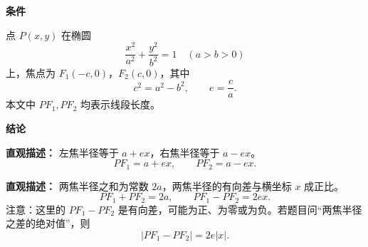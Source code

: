 \begin{statementbox}
	\textbf{\textcolor{CStatement}{条件}}
	\begin{description}[style=nextline, leftmargin=2.8em, labelsep=0.5em, itemsep=0.35em]
		\item[\textbf{\textcolor{CStatement}{条件 1（椭圆标准式）：}}] 点 $P(x,y)$ 在椭圆
		      \[
			      \frac{x^2}{a^2}+\frac{y^2}{b^2}=1\quad (a>b>0)
		      \]
		      上，焦点为 $F_1(-c,0)$，$F_2(c,0)$，其中
		      \[
			      c^2=a^2-b^2,\qquad e=\frac{c}{a}.
		      \]
		      本文中 $PF_1,PF_2$ 均表示线段长度。
	\end{description}

	\textbf{\textcolor{CStatement}{结论}}
	\begin{description}[style=nextline, leftmargin=2.8em, labelsep=0.5em, itemsep=0.45em]
		\item[\textbf{\textcolor{CStatement}{结论一（焦半径公式）：}}]
		      \textbf{\textcolor{CStatement}{直观描述：}} 左焦半径等于 $a+ex$，右焦半径等于 $a-ex$。
		      \[
			      PF_1 = a+ex,\qquad PF_2 = a-ex.
		      \]

		\item[\textbf{\textcolor{CStatement}{推广结论（焦半径和差）：}}]
		      \textbf{\textcolor{CStatement}{直观描述：}} 两焦半径之和为常数 $2a$，两焦半径的有向差与横坐标 $x$ 成正比。
		      \[
			      PF_1+PF_2 = 2a,\qquad PF_1-PF_2 = 2ex.
		      \]
		      注意：这里的 $PF_1-PF_2$ 是有向差，可能为正、为零或为负。若题目问“两焦半径之差的绝对值”，则
		      \[
			      |PF_1-PF_2| = 2e|x|.
		      \]
	\end{description}
\end{statementbox}